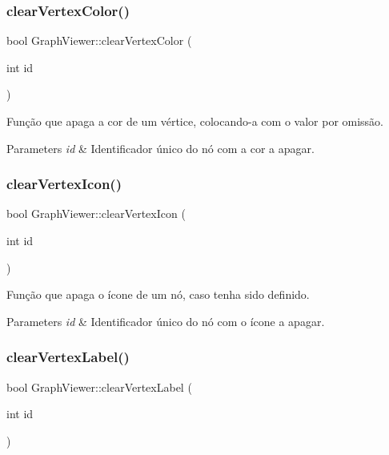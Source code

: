 \subsubsection{\texorpdfstring{clear\+Vertex\+Color()}{clearVertexColor()}}
{\footnotesize\ttfamily bool Graph\+Viewer\+::clear\+Vertex\+Color (\begin{DoxyParamCaption}\item[{int}]{id }\end{DoxyParamCaption})}

Função que apaga a cor de um vértice, colocando-\/a com o valor por omissão.


\begin{DoxyParams}{Parameters}
{\em id} & Identificador único do nó com a cor a apagar. \\
\hline
\end{DoxyParams}
\mbox{\label{class_graph_viewer_aecbeec01205b7f93cf73a65282f2daba}} 
\subsubsection{\texorpdfstring{clear\+Vertex\+Icon()}{clearVertexIcon()}}
{\footnotesize\ttfamily bool Graph\+Viewer\+::clear\+Vertex\+Icon (\begin{DoxyParamCaption}\item[{int}]{id }\end{DoxyParamCaption})}

Função que apaga o ícone de um nó, caso tenha sido definido.


\begin{DoxyParams}{Parameters}
{\em id} & Identificador único do nó com o ícone a apagar. \\
\hline
\end{DoxyParams}
\mbox{\label{class_graph_viewer_a007bd78a6959ac37119eb18a8e8bca4c}} 
\subsubsection{\texorpdfstring{clear\+Vertex\+Label()}{clearVertexLabel()}}
{\footnotesize\ttfamily bool Graph\+Viewer\+::clear\+Vertex\+Label (\begin{DoxyParamCaption}\item[{int}]{id }\end{DoxyParamCaption})}

